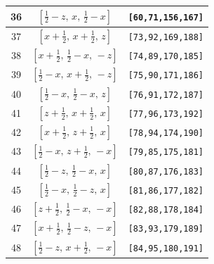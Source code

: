 \documentclass[fleqn,8pt]{jsarticle}
\begin{document}
\begin{longtable}{ccc}
36 & $\left[ \frac{1}{2} - z,\, x,\, \frac{1}{2} - x \right]$ & {\tt [60,71,156,167]} \\ \hline
37 & $\left[ x + \frac{1}{2},\, x + \frac{1}{2},\, z \right]$ & {\tt [73,92,169,188]} \\ \hline
38 & $\left[ x + \frac{1}{2},\, \frac{1}{2} - x,\, - z \right]$ & {\tt [74,89,170,185]} \\ \hline
39 & $\left[ \frac{1}{2} - x,\, x + \frac{1}{2},\, - z \right]$ & {\tt [75,90,171,186]} \\ \hline
40 & $\left[ \frac{1}{2} - x,\, \frac{1}{2} - x,\, z \right]$ & {\tt [76,91,172,187]} \\ \hline
41 & $\left[ z + \frac{1}{2},\, x + \frac{1}{2},\, x \right]$ & {\tt [77,96,173,192]} \\ \hline
42 & $\left[ x + \frac{1}{2},\, z + \frac{1}{2},\, x \right]$ & {\tt [78,94,174,190]} \\ \hline
43 & $\left[ \frac{1}{2} - x,\, z + \frac{1}{2},\, - x \right]$ & {\tt [79,85,175,181]} \\ \hline
44 & $\left[ \frac{1}{2} - z,\, \frac{1}{2} - x,\, x \right]$ & {\tt [80,87,176,183]} \\ \hline
45 & $\left[ \frac{1}{2} - x,\, \frac{1}{2} - z,\, x \right]$ & {\tt [81,86,177,182]} \\ \hline
46 & $\left[ z + \frac{1}{2},\, \frac{1}{2} - x,\, - x \right]$ & {\tt [82,88,178,184]} \\ \hline
47 & $\left[ x + \frac{1}{2},\, \frac{1}{2} - z,\, - x \right]$ & {\tt [83,93,179,189]} \\ \hline
48 & $\left[ \frac{1}{2} - z,\, x + \frac{1}{2},\, - x \right]$ & {\tt [84,95,180,191]} \\
\end{longtable}
\renewcommand{\arraystretch}{1.2}
\end{document}
